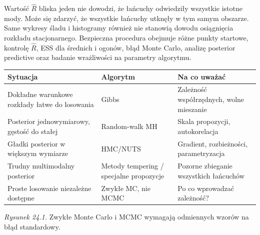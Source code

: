 \begin{uwaga}
Wartość $\widehat R$ bliska jeden nie dowodzi,
że łańcuchy odwiedziły wszystkie istotne mody. Może
się zdarzyć, że wszystkie łańcuchy utknęły w tym samym
obszarze. Same wykresy śladu i histogramy również nie
stanowią dowodu osiągnięcia rozkładu stacjonarnego.
Bezpieczna procedura obejmuje różne punkty startowe,
kontrolę $\widehat R$, ESS dla średnich i ogonów,
błąd Monte Carlo, analizę posterior predictive oraz
badanie wrażliwości na parametry algorytmu.
\end{uwaga}

\begin{center}\small
\begin{tabular}{>{\raggedright\arraybackslash}p{}>{\raggedright\arraybackslash}p{}>{\raggedright\arraybackslash}p{}}
\toprule
\textbf{Sytuacja} & \textbf{Algorytm} & \textbf{Na co uważać}\\
\midrule
Dokładne warunkowe rozkłady łatwe do losowania & Gibbs & Zależność współrzędnych, wolne mieszanie\\
Posterior jednowymiarowy, gęstość do stałej & Random-walk MH & Skala propozycji, autokorelacja\\
Gładki posterior w większym wymiarze & HMC/NUTS & Gradient, rozbieżności, parametryzacja\\
Trudny multimodalny posterior & Metody tempering / specjalne propozycje & Pozorne zbieganie wszystkich łańcuchów\\
Proste losowanie niezależne dostępne & Zwykłe MC, nie MCMC & Po co wprowadzać zależność?\\
\bottomrule
\end{tabular}
\end{center}

\begin{center}

{\small\emph{Rysunek 24.1.} Zwykłe Monte Carlo i MCMC wymagają odmiennych wzorów na błąd standardowy.}
\end{center}

